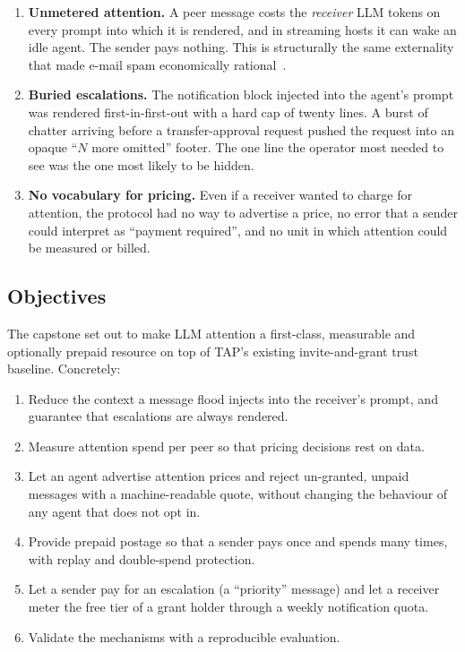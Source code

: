 \begin{enumerate}
  \item \textbf{Unmetered attention.} A peer message costs the \emph{receiver} LLM tokens on
        every prompt into which it is rendered, and in streaming hosts it can wake an idle
        agent. The sender pays nothing. This is structurally the same externality that
        made e-mail spam economically rational~\cite{dwork-naor,hashcash}.
  \item \textbf{Buried escalations.} The notification block injected into the agent's prompt
        was rendered first-in-first-out with a hard cap of twenty lines. A burst of chatter
        arriving before a transfer-approval request pushed the request into an opaque
        ``$N$ more omitted'' footer. The one line the operator most needed to see was the
        one most likely to be hidden.
  \item \textbf{No vocabulary for pricing.} Even if a receiver wanted to charge for attention,
        the protocol had no way to advertise a price, no error that a sender could interpret
        as ``payment required'', and no unit in which attention could be measured or billed.
\end{enumerate}

\subsection{Objectives}

The capstone set out to make LLM attention a first-class, measurable and optionally
prepaid resource on top of TAP's existing invite-and-grant trust baseline. Concretely:

\begin{enumerate}[label=O\arabic*.]
  \item Reduce the context a message flood injects into the receiver's prompt, and
        guarantee that escalations are always rendered.
  \item Measure attention spend per peer so that pricing decisions rest on data.
  \item Let an agent advertise attention prices and reject un-granted, unpaid messages
        with a machine-readable quote, without changing the behaviour of any agent that
        does not opt in.
  \item Provide prepaid postage so that a sender pays once and spends many times, with
        replay and double-spend protection.
  \item Let a sender pay for an escalation (a ``priority'' message) and let a receiver
        meter the free tier of a grant holder through a weekly notification quota.
  \item Validate the mechanisms with a reproducible evaluation.
\end{enumerate}

